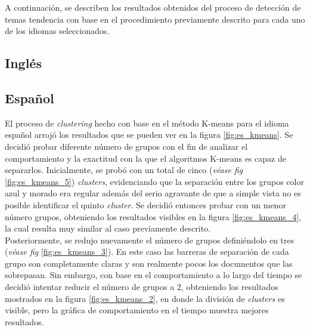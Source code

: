 A continuación, se describen los resultados obtenidos del proceso de detección de temas tendencia con base en el procedimiento previamente descrito para cada uno de los idiomas seleccionados.

\subsection{Inglés}
\subsection{Español}

El proceso de \textit{clustering} hecho con base en el método K-means para el idioma español arrojó los resultados que se pueden ver en la figura \ref{fig:es_kmeans}. Se decidió probar diferente número de grupos con el fin de analizar el comportamiento y la exactitud con la que el algoritmos K-means es capaz de separarlos. Inicialmente, se probó con un total de cinco (\textit{véase fig} \ref{fig:es_kmeans_5}) \textit{clusters}, evidenciando que la separación entre los grupos color azul y morado era regular además del serio agravante de que a simple vista no es posible identificar el quinto \textit{cluster}. Se decidió entonces probar con un menor número grupos, obteniendo los resultados visibles en la figura \ref{fig:es_kmeans_4}, la cual resulta muy similar al caso previamente descrito.\\

Posteriormente, se redujo nuevamente el número de grupos definiéndolo en tres (\textit{véase fig} \ref{fig:es_kmeans_3}). En este caso las barreras de separación de cada grupo son completamente claras y son realmente pocos los documentos que las sobrepasan. Sin embargo, con base en el comportamiento a lo largo del tiempo se decidió intentar reducir el número de grupos a 2, obteniendo los resultados mostrados en la figura \ref{fig:es_kmeans_2}, en donde la división de \textit{clusters} es visible, pero la gráfica de comportamiento en el tiempo muestra mejores resultados.

